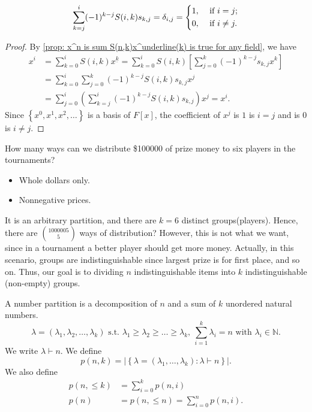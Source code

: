 \begin{corollary}
    \[
        \sum_{k=j}^i (-1)^{k-j} S(i, k) s_{k,j} = \delta _{i,j} = \begin{dcases}
            1, &\text{ if } i=j ;\\
            0, &\text{ if }  i \neq j.
        \end{dcases} 
    \]
\end{corollary}
\begin{proof}
    By \autoref{prop: x^n is sum S(n,k)x^underline(k) is true for any field}, we have 
    \begin{align*}
        x^i &= \sum_{k=0}^i S(i, k)x^{\underline{k}} = \sum_{k=0}^i S(i, k) \left[ \sum_{j=0}^k (-1)^{k-j} s_{k, j}x^k  \right] \\
        &= \sum_{k=0}^i \sum_{j=0}^k (-1)^{k-j} S(i, k) s_{k, j}x^j \\
        &= \sum_{j=0}^i \left( \sum_{k=j}^i (-1)^{k-j} S(i, k) s_{k, j} \right) x^j = x^i.    
    \end{align*}
    Since \(\left\{ x^0, x^1, x^2, \dots  \right\} \) is a basis of \(F[x]\), the coefficient of \(x^j\) is \(1\) is \(i=j\) and is \(0\) is \(i \neq j\).      
\end{proof}

\begin{question}
    How many ways can we distribute \$100000 of prize money to six players in the tournaments?
    \begin{itemize}
        \item Whole dollars only. 
        \item Nonnegative prices.
    \end{itemize}
\end{question}
It is an arbitrary partition, and there are \(k=6\) distinct groups(players). Hence, there are \(\binom{1000005}{5}\) ways of distribution? However, this is not what we want, since in a tournament a better player should get more money. Actually, in this scenario, groups are indistinguishable since largest prize is for first place, and so on. Thus, our goal is to dividing \(n\) indistinguishable items into \(k\) indistinguishable (non-empty) groups. 

\begin{definition}
    A number partition is a decomposition of \(n\) and a sum of \(k\) unordered natural numbers.  
    \[
        \lambda = (\lambda _1, \lambda _2, \dots , \lambda _k) \text{ s.t. } \lambda _1 \ge \lambda _2 \ge \dots \ge \lambda _k, \ \sum_{i=1}^k \lambda  _i = n \text{ with } \lambda _i \in \mathbb{N} . 
    \]
    We write \(\lambda \vdash n\). We define 
    \[
        p(n, k) = \left\vert \left\{ \lambda = (\lambda _1, \dots , \lambda _k) : \lambda \vdash n \right\}  \right\vert.
    \] 
    We also define 
    \begin{align*}
        p(n, \le k) &= \sum_{i=0}^k p(n, i) \\
        p(n) &= p(n, \le n) = \sum_{i=0}^n p(n, i) .
    \end{align*}
\end{definition}


